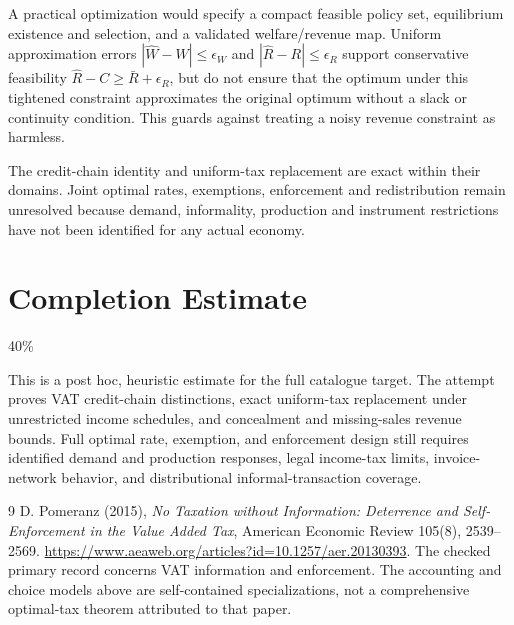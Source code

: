 \documentclass[11pt,a4paper]{article}
\begin{document}
A practical optimization would specify a compact feasible policy set, equilibrium existence and selection, and a validated welfare/revenue map. Uniform approximation errors $|\widehat W-W|\le\epsilon_W$ and $|\widehat R-R|\le\epsilon_R$ support conservative feasibility $\widehat R-C\ge\bar R+\epsilon_R$, but do not ensure that the optimum under this tightened constraint approximates the original optimum without a slack or continuity condition. This guards against treating a noisy revenue constraint as harmless.

The credit-chain identity and uniform-tax replacement are exact within their domains. Joint optimal rates, exemptions, enforcement and redistribution remain unresolved because demand, informality, production and instrument restrictions have not been identified for any actual economy.

\section{Completion Estimate}
40\%

This is a post hoc, heuristic estimate for the full catalogue target.
The attempt proves VAT credit-chain distinctions, exact uniform-tax replacement under unrestricted income schedules, and concealment and missing-sales revenue bounds. Full optimal rate, exemption, and enforcement design still requires identified demand and production responses, legal income-tax limits, invoice-network behavior, and distributional informal-transaction coverage.

\begin{thebibliography}{9}
 D. Pomeranz (2015), \emph{No Taxation without Information: Deterrence and Self-Enforcement in the Value Added Tax}, American Economic Review 105(8), 2539--2569. \url{https://www.aeaweb.org/articles?id=10.1257/aer.20130393}. The checked primary record concerns VAT information and enforcement. The accounting and choice models above are self-contained specializations, not a comprehensive optimal-tax theorem attributed to that paper.
\end{thebibliography}
\end{document}
